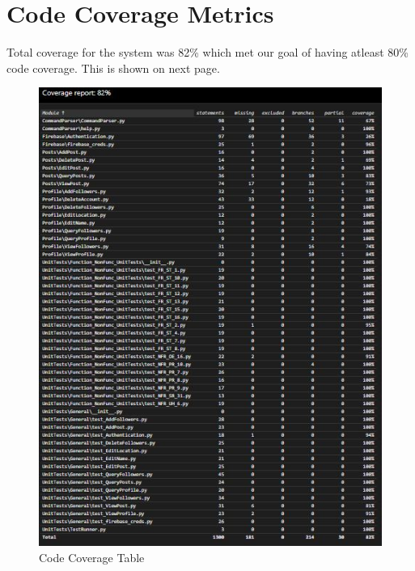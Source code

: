 \documentclass[12pt, titlepage]{article}
\begin{document}
\newpage
\section{Code Coverage Metrics}
Total coverage for the system was 82\% which met our goal of having atleast 80\% code coverage. This is shown on next page.
\begin{figure}[htbp]
\centering
\includegraphics[width=\textwidth]{coverage.JPG}
\caption{Code Coverage Table}
\label{FigUH}
\end{figure}




\end{document}
